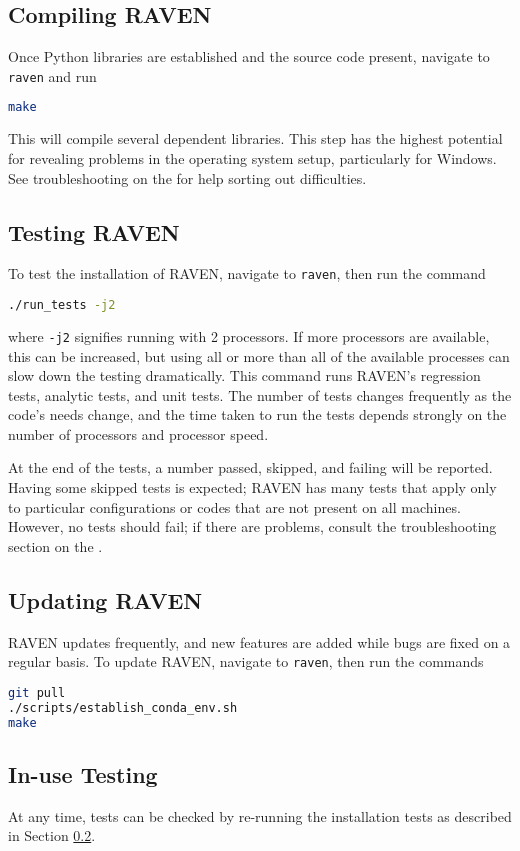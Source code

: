 \subsection{Compiling RAVEN}
Once Python libraries are established and the source code present, navigate to \texttt{raven} and run
\begin{lstlisting}[language=bash]
make
\end{lstlisting}
This will compile several dependent libraries.  This step has the highest potential for revealing problems in
the operating system setup, particularly for Windows.  See troubleshooting on the \wiki for help sorting out
difficulties.


\subsection{Testing RAVEN}
\label{sec:testing raven}
To test the installation of RAVEN, navigate to \texttt{raven}, then run the command
\begin{lstlisting}[language=bash]
./run_tests -j2
\end{lstlisting}
where \texttt{-j2} signifies running with 2 processors.  If more processors are available, this can be
increased, but using all or more than all of the available processes can slow down the testing dramatically.
This command runs RAVEN's regression tests, analytic tests, and unit tests.  The number of tests changes
frequently as the code's needs change, and the time taken to run the tests depends strongly on the number of
processors and processor speed.

At the end of the tests, a number passed, skipped, and failing will be reported.  Having some skipped tests is
expected; RAVEN has many tests that apply only to particular configurations or codes that are not present on
all machines.  However, no tests should fail; if there are problems, consult the troubleshooting section on
the \wiki.


\subsection{Updating RAVEN}
RAVEN updates frequently, and new features are added while bugs are fixed on a regular basis.  To update
RAVEN, navigate to \texttt{raven}, then run the commands
\begin{lstlisting}[language=bash]
git pull
./scripts/establish_conda_env.sh
make
\end{lstlisting}


\subsection{In-use Testing}

At any time, tests can be checked by re-running the installation tests as
described in Section \ref{sec:testing raven}.
